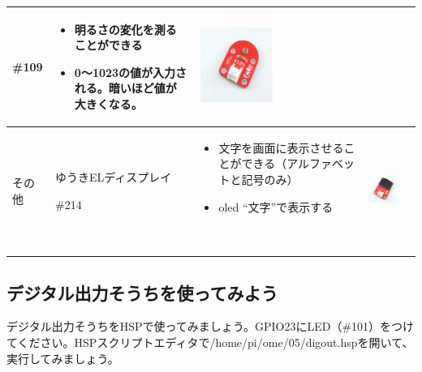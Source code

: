\documentclass[a4paper,dvipdfmx]{jarticle}
\begin{document}
\begin{flushleft}
\begin{supertabular}{|m{2.34cm}|m{2.658cm}|m{6.4090004cm}|m{3.672cm}|m{1.211cm}|}
{\mdseries \#109} &
\begin{itemize}
\item 明るさの変化を測ることができる
\item
0〜1023の値が入力される。暗いほど値が大きくなる。
\end{itemize}
 &
\centering
\includegraphics[width=2.399cm,height=2.425cm]{text05-img/text05-img023.png}
 &
{\mdseries \pageref{bkm:RefHeadingToc25715508239293}}\\\hline
{\mdseries その他} &
{\mdseries ゆうきELディスプレイ}

{\mdseries \#214} &
\begin{itemize}
\item
文字を画面に表示させることができる（アルファベットと記号のみ）
\item oled ``文字''で表示する
\end{itemize}
~
 &
\centering
\includegraphics[width=2.886cm,height=2.808cm]{text05-img/text05-img024.png}
 &
{\mdseries \pageref{bkm:RefHeadingToc25717508239293}}\\\hline
\end{supertabular}
\end{flushleft}

\bigskip

\clearpage
\bigskip

\subsection{デジタル出力そうちを使ってみよう}
デジタル出力そうちをHSPで使ってみましょう。GPIO23にLED（\#101）をつけてください。HSPスクリプトエディタで/home/pi/ome/05/digout.hspを開いて、実行してみましょう。
\end{document}
